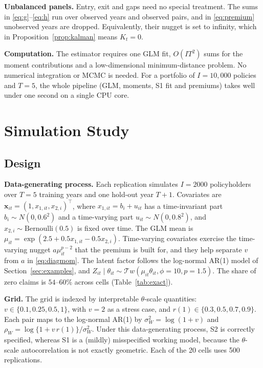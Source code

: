 \documentclass[mathematics,article,submit,moreauthors]{Definitions/mdpi}
\newcommand{\Tw}{\mathcal{T}w}
\newcommand{\bx}{\boldsymbol{x}}
\begin{document}
\textbf{Unbalanced panels.} Entry, exit and gaps need no special treatment. The sums in \eqref{eq:g}--\eqref{eq:h} run over observed years and observed pairs, and in \eqref{eq:premium} unobserved years are dropped. Equivalently, their nugget is set to infinity, which in Proposition~\ref{prop:kalman} means $K_t=0$.

\textbf{Computation.} The estimator requires one GLM fit, $O(IT^2)$ sums for the moment contributions and a low-dimensional minimum-distance problem. No numerical integration or MCMC is needed. For a portfolio of $I=10{,}000$ policies and $T=5$, the whole pipeline (GLM, moments, S1 fit and premiums) takes well under one second on a single CPU core.

\section{Simulation Study}\label{sec:simulation}

\subsection{Design}\label{sec:design}

\textbf{Data-generating process.} Each replication simulates $I=2000$ policyholders over $T=5$ training years and one hold-out year $T+1$. Covariates are $\bx_{it}=(1,x_{1,it},x_{2,i})^\top$, where $x_{1,it}=b_i+u_{it}$ has a time-invariant part $b_i\sim N(0,0.6^2)$ and a time-varying part $u_{it}\sim N(0,0.8^2)$, and $x_{2,i}\sim\mathrm{Bernoulli}(0.5)$ is fixed over time. The GLM mean is $\mu_{it}=\exp(2.5+0.5x_{1,it}-0.5x_{2,i})$. Time-varying covariates exercise the time-varying nugget $a\mu_{it}^{p-2}$ that the premium is built for, and they help separate $v$ from $a$ in \eqref{eq:diagmom}. The latent factor follows the log-normal AR(1) model of Section~\ref{sec:examples}, and $Z_{it}\mid\theta_{it}\sim\Tw(\mu_{it}\theta_{it},\phi=10,p=1.5)$. The share of zero claims is $54$--$60\%$ across cells (Table~\ref{tab:exact}).

\textbf{Grid.} The grid is indexed by interpretable $\theta$-scale quantities: $v\in\{0.1,0.25,0.5,1\}$, with $v=2$ as a stress case, and $r(1)\in\{0.3,0.5,0.7,0.9\}$. Each pair maps to the log-normal AR(1) by $\sigma_W^2=\log(1+v)$ and $\rho_W=\log\{1+v\,r(1)\}/\sigma_W^2$. Under this data-generating process, S2 is correctly specified, whereas S1 is a (mildly) misspecified working model, because the $\theta$-scale autocorrelation is not exactly geometric. Each of the 20 cells uses 500 replications.
\end{document}
